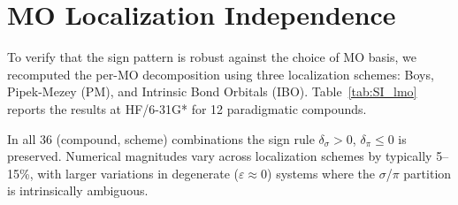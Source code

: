 \documentclass[11pt,a4paper]{article}
\begin{document}
\section{MO Localization Independence}
\label{sec:SI_lmo}

To verify that the sign pattern is robust against the choice of MO basis,
we recomputed the per-MO decomposition using three localization schemes:
Boys, Pipek-Mezey (PM), and Intrinsic Bond Orbitals (IBO). Table~\ref{tab:SI_lmo}
reports the results at HF/6-31G* for 12 paradigmatic compounds.

In all 36 (compound, scheme) combinations the sign rule
$\delta_\sigma > 0$, $\delta_\pi \le 0$ is preserved. Numerical
magnitudes vary across localization schemes by typically 5--15\%, with
larger variations in degenerate ($\varepsilon \approx 0$) systems
where the $\sigma$/$\pi$ partition is intrinsically ambiguous.
\end{document}
